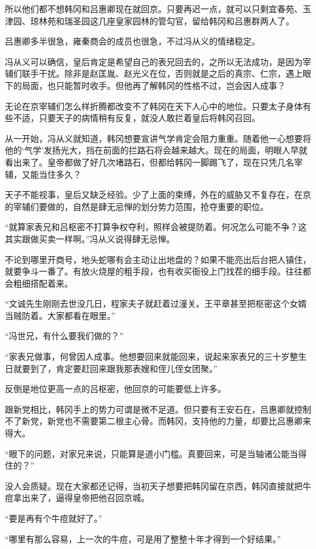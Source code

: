 所以他们都不想韩冈和吕惠卿现在就回京。只要再迟一点，就可以只剩宜春苑、玉津园、琼林苑和瑞圣园这几座皇家园林的管勾官，留给韩冈和吕惠群两人了。

吕惠卿多半很急，雍秦商会的成员也很急，不过冯从义的情绪稳定。

冯从义可以确信，皇后肯定是希望自己的表兄回去的，之所以无法成功，是因为宰辅们联手干扰。除非是赵匡胤、赵光义在位，否则就是之后的真宗、仁宗，遇上眼下的局面，也只能暂时收手。但他再了解韩冈的性格不过，岂会因人成事？

无论在京宰辅们怎么样折腾都改变不了韩冈在天下人心中的地位。只要太子身体有些不适，只要天子的病情稍有反复，就没人敢拦着皇后将韩冈召回。

从一开始，冯从义就知道，韩冈想要宣讲气学肯定会阻力重重。随着他一心想要将他的‘气学’发扬光大，挡在前面的拦路石将会越来越大。现在的局面，明眼人早就看出来了。皇帝都做了好几次堵路石，但都给韩冈一脚踢飞了，现在只凭几名宰辅，又能当住多久？

天子不能视事，皇后又缺乏经验。少了上面的束缚，外在的威胁又不复存在，在京的宰辅们要做的，自然是肆无忌惮的划分势力范围，抢夺重要的职位。

“就算家表兄和吕枢密不打算争权夺利，照样会被提防着。何况怎么可能不争？这其实跟做买卖一样啊。”冯从义说得肆无忌惮。

不论到哪里开商号，地头蛇哪有会主动让出地盘的？如果不能亮出后台把人镇住，就要争斗一番了。有放火烧屋的粗手段，也有收买衙役上门找茬的细手段。往往都会粗细搭配着来。

“文诚先生刚刚去世没几日，程家夫子就赶着过潼关。王平章甚至把枢密这个女婿当贼防着。大家都看在眼里。”

“冯世兄，有什么要我们做的？”

“家表兄做事，何曾因人成事。他想要回来就能回来，说起来家表兄的三十岁整生日就要到了，肯定要赶回来跟我那表嫂和侄儿侄女团聚。”

反倒是地位更高一点的吕枢密，他回京的可能要低上许多。

跟新党相比，韩冈手上的势力可谓是微不足道。但只要有王安石在，吕惠卿就控制不了新党，新党也不需要第二根主心骨。而韩冈，支持他的力量，却要比吕惠卿来得大。

“眼下的问题，对家兄来说，只能算是道小门槛。真要回来，可是当轴诸公能当得住的？”

没人会质疑。现在大家都还记得，当初天子想要把韩冈留在京西，韩冈直接就把牛痘拿出来了，逼得皇帝把他召回京城。

“要是再有个牛痘就好了。”

“哪里有那么容易，上一次的牛痘，可是用了整整十年才得到一个好结果。”

